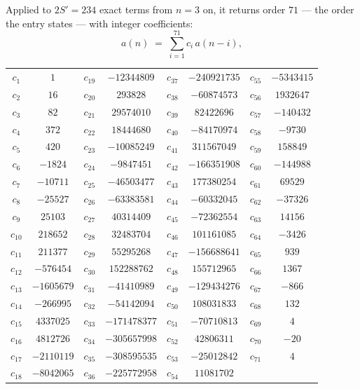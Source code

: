 \documentclass[11pt,a4paper]{article}
\theoremstyle{plain}
\theoremstyle{definition}
\begin{document}
Applied to $2S'=234$ exact terms from $n=3$ on, it returns order $71$ --- the
order the entry states --- with integer coefficients:
\[
a(n)\;=\;\sum_{i=1}^{71}c_i\,a(n-i),
\]
\begin{center}\small
\begin{tabular}{cccccccc}
$c_{1}$ & $1$ & $c_{19}$ & $-12344809$ & $c_{37}$ & $-240921735$ & $c_{55}$ & $-5343415$ \\
$c_{2}$ & $16$ & $c_{20}$ & $293828$ & $c_{38}$ & $-60874573$ & $c_{56}$ & $1932647$ \\
$c_{3}$ & $82$ & $c_{21}$ & $29574010$ & $c_{39}$ & $82422696$ & $c_{57}$ & $-140432$ \\
$c_{4}$ & $372$ & $c_{22}$ & $18444680$ & $c_{40}$ & $-84170974$ & $c_{58}$ & $-9730$ \\
$c_{5}$ & $420$ & $c_{23}$ & $-10085249$ & $c_{41}$ & $311567049$ & $c_{59}$ & $158849$ \\
$c_{6}$ & $-1824$ & $c_{24}$ & $-9847451$ & $c_{42}$ & $-166351908$ & $c_{60}$ & $-144988$ \\
$c_{7}$ & $-10711$ & $c_{25}$ & $-46503477$ & $c_{43}$ & $177380254$ & $c_{61}$ & $69529$ \\
$c_{8}$ & $-25527$ & $c_{26}$ & $-63383581$ & $c_{44}$ & $-60332045$ & $c_{62}$ & $-37326$ \\
$c_{9}$ & $25103$ & $c_{27}$ & $40314409$ & $c_{45}$ & $-72362554$ & $c_{63}$ & $14156$ \\
$c_{10}$ & $218652$ & $c_{28}$ & $32483704$ & $c_{46}$ & $101161085$ & $c_{64}$ & $-3426$ \\
$c_{11}$ & $211377$ & $c_{29}$ & $55295268$ & $c_{47}$ & $-156688641$ & $c_{65}$ & $939$ \\
$c_{12}$ & $-576454$ & $c_{30}$ & $152288762$ & $c_{48}$ & $155712965$ & $c_{66}$ & $1367$ \\
$c_{13}$ & $-1605679$ & $c_{31}$ & $-41410989$ & $c_{49}$ & $-129434276$ & $c_{67}$ & $-866$ \\
$c_{14}$ & $-266995$ & $c_{32}$ & $-54142094$ & $c_{50}$ & $108031833$ & $c_{68}$ & $132$ \\
$c_{15}$ & $4337025$ & $c_{33}$ & $-171478377$ & $c_{51}$ & $-70710813$ & $c_{69}$ & $4$ \\
$c_{16}$ & $4812726$ & $c_{34}$ & $-305657998$ & $c_{52}$ & $42806311$ & $c_{70}$ & $-20$ \\
$c_{17}$ & $-2110119$ & $c_{35}$ & $-308595535$ & $c_{53}$ & $-25012842$ & $c_{71}$ & $4$ \\
$c_{18}$ & $-8042065$ & $c_{36}$ & $-225772958$ & $c_{54}$ & $11081702$ &  &  \\
\end{tabular}
\end{center}
\end{document}
